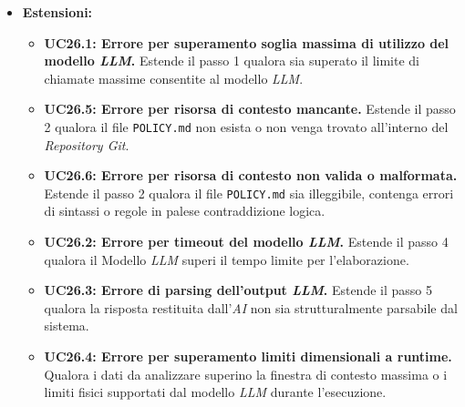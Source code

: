 \documentclass[12pt, a4paper]{article}
\begin{document}
\begin{itemize}
\begin{enumerate}
        \item Il sistema estrae il codice sorgente dell'ambito selezionato tramite le \textit{API} di Git.
        \item Il sistema compone il prompt contestuale unendo il codice estratto con le regole di \textit{policy} lette, per poi inviarlo alle \textit{API} del Modello \textit{AI}.
        \item Il Modello \textit{AI} confronta il codice con le direttive di sviluppo sicuro e restituisce al sistema l'elenco delle violazioni normative riscontrate, corredate dai relativi suggerimenti di \textit{remediation} (sotto forma di \textit{snippet} di codice correttivo o descrizioni testuali).
        \item Il sistema formatta le non conformità ottenute per la visualizzazione strutturata nel report, associandole alla categoria di regola infranta, al file/riga in cui si verifica l'anomalia (UC25.2.2) e integrando le soluzioni proposte nei moduli per gli \textit{snippet} di codice (UC25.2.3) o di testo formattato (UC25.2.1).
        \item Il sistema registra il successo dell'attività, aggiorna lo stato a "Completato" (UC22.1.2) e rende disponibile all'utente il report (UC25).
    \end{enumerate}
    \item \textbf{Estensioni:}
    \begin{itemize}
        \item \textbf{UC26.1: Errore per superamento soglia massima di utilizzo del modello \textit{LLM}.} Estende il passo 1 qualora sia superato il limite di chiamate massime consentite al modello \textit{LLM}.
        \item \textbf{UC26.5: Errore per risorsa di contesto mancante.} Estende il passo 2 qualora il file \texttt{POLICY.md} non esista o non venga trovato all'interno del \textit{Repository Git}.
        \item \textbf{UC26.6: Errore per risorsa di contesto non valida o malformata.} Estende il passo 2 qualora il file \texttt{POLICY.md} sia illeggibile, contenga errori di sintassi o regole in palese contraddizione logica.
        \item \textbf{UC26.2: Errore per timeout del modello \textit{LLM}.} Estende il passo 4 qualora il Modello \textit{LLM} superi il tempo limite per l'elaborazione.
        \item \textbf{UC26.3: Errore di parsing dell'output \textit{LLM}.} Estende il passo 5 qualora la risposta restituita dall'\textit{AI} non sia strutturalmente parsabile dal sistema.
        \item \textbf{UC26.4: Errore per superamento limiti dimensionali a runtime.} Qualora i dati da analizzare superino la finestra di contesto massima o i limiti fisici supportati dal modello \textit{LLM} durante l'esecuzione.
    \end{itemize}
\end{itemize}
\end{document}
